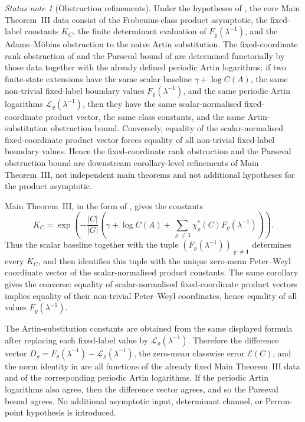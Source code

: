 \documentclass[11pt,a4paper]{amsart}
\theoremstyle{plain}
\theoremstyle{definition}
\theoremstyle{remark}
\newtheorem*{statusnote}{Status note}
\begin{document}
\begin{statusnote}[Obstruction refinements]
  Under the hypotheses of , the
  core Main Theorem~III data consist of the Frobenius-class product asymptotic, the
  fixed-label constants \(K_C\), the finite determinant evaluation of
  \(F_\varrho(\lambda^{-1})\), and the Adams--M\"obius obstruction to the
  naive Artin substitution.  The fixed-coordinate rank obstruction of
   and the Parseval
  bound of  are determined functorially by
  those data together with the already defined periodic Artin logarithms:
  if two finite-state extensions have the same scalar baseline
  \(\gamma+\log C(A)\), the same non-trivial fixed-label boundary values
  \(F_\varrho(\lambda^{-1})\), and the same periodic Artin logarithms
  \(\mathcal L_\varrho(\lambda^{-1})\), then they have the same
  scalar-normalised fixed-coordinate product vector, the same class constants,
  and the same
  Artin-substitution obstruction bound.  Conversely, equality of the
  scalar-normalised fixed-coordinate product vector forces equality of all
  non-trivial
  fixed-label boundary values.  Hence the fixed-coordinate rank obstruction
  and the Parseval
  obstruction bound are downstream corollary-level refinements of Main
  Theorem~III, not independent main theorems and not additional hypotheses for
  the product asymptotic.
\end{statusnote}

Main Theorem~III, in the form of ,
gives the constants
  \[
    K_C=
    \exp\!\left(-\frac{|C|}{|G|}
      \left(\gamma+\log C(A)+
      \sum_{\varrho\ne\mathbf1}\chi_\varrho^\ast(C)
        F_\varrho(\lambda^{-1})\right)\right).
  \]
  Thus the scalar baseline together with the tuple
  \((F_\varrho(\lambda^{-1}))_{\varrho\ne\mathbf1}\) determines every
  \(K_C\), and  then
  identifies this tuple with the unique zero-mean Peter--Weyl coordinate
  vector of the scalar-normalised product constants.  The same corollary gives
  the converse: equality of scalar-normalised fixed-coordinate product vectors
  implies
  equality of their non-trivial Peter--Weyl coordinates, hence equality of all
  values \(F_\varrho(\lambda^{-1})\).

  The Artin-substitution constants are obtained from the same displayed
  formula after replacing each fixed-label value by
  \(\mathcal L_\varrho(\lambda^{-1})\).  Therefore the difference vector
  \(D_\varrho=F_\varrho(\lambda^{-1})-
  \mathcal L_\varrho(\lambda^{-1})\), the zero-mean classwise error
  \(\mathcal E(C)\), and the norm identity in
   are all functions of the already fixed
  Main Theorem~III data and of the corresponding periodic Artin logarithms.
If the periodic Artin logarithms also agree, then the difference vector agrees,
and so the Parseval bound agrees.  No additional asymptotic input, determinant
channel, or Perron-point hypothesis is introduced.
\end{document}
